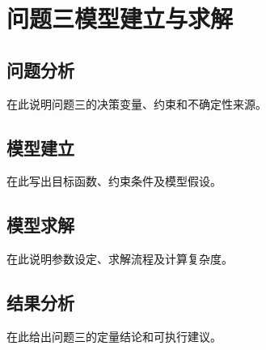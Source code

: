 \section{问题三模型建立与求解}

\subsection{问题分析}
在此说明问题三的决策变量、约束和不确定性来源。

\subsection{模型建立}
在此写出目标函数、约束条件及模型假设。

\subsection{模型求解}
在此说明参数设定、求解流程及计算复杂度。

\subsection{结果分析}
在此给出问题三的定量结论和可执行建议。
